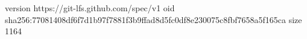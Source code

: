 version https://git-lfs.github.com/spec/v1
oid sha256:77081408df6f7d1b97f7881f3b9ffad8d5fc0df8e230075c8fbf7658a5f165ca
size 1164
